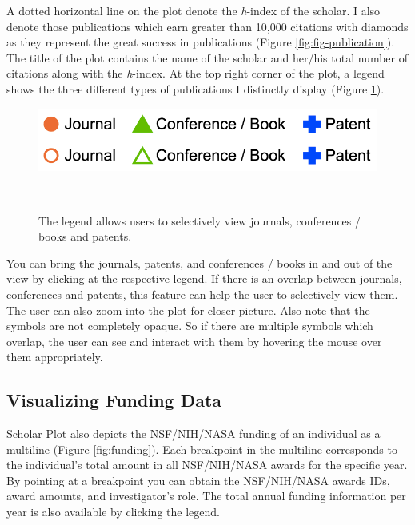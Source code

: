 A dotted horizontal line on the plot denote the {\it h}-index of the scholar. I also denote those publications which earn greater than 10,000 citations with diamonds as they represent the great success in publications (Figure \ref{fig:fig-publication}). The title of the plot contains the name of the scholar and her/his total number of citations along with the {\it h}-index. At the top right corner of the plot, a legend shows the three different types of publications I distinctly display (Figure \ref{fig:fig-legend}).

\begin{figure}[!htb]
\centering
  \includegraphics[width=0.9\columnwidth]{figures/fig_legend-toggle}
  \caption{The legend allows users to selectively view journals, conferences / books and patents.}~\label{fig:fig-legend}
\end{figure}

You can bring the journals, patents, and conferences / books in and out of the view by clicking at the respective legend. If there is an overlap between journals, conferences and patents, this feature can help the user to selectively view them. The user can also zoom into the plot for closer picture. Also note that the symbols are not completely opaque. So if there are multiple symbols which overlap, the user can see and interact with them by hovering the mouse over them appropriately.

\subsection{Visualizing Funding Data}
Scholar Plot also depicts the NSF/NIH/NASA funding of an individual as a multiline (Figure \ref{fig:funding}). Each breakpoint in the multiline corresponds to the individual's total amount in all NSF/NIH/NASA awards for the specific year. By pointing at a breakpoint you can obtain the NSF/NIH/NASA awards IDs, award amounts, and investigator's role. The total annual funding information per year is also available by clicking the legend. 


